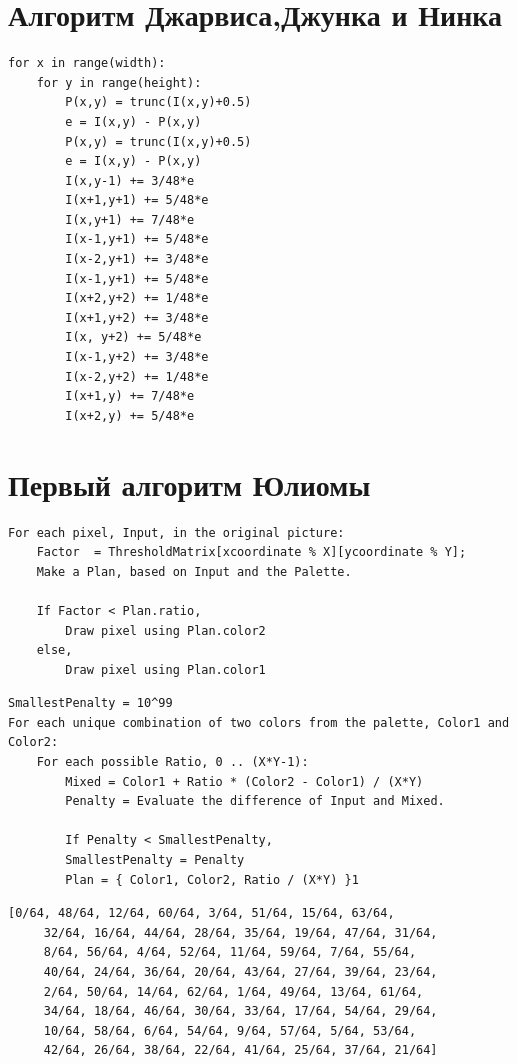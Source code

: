 \section{Алгоритм Джарвиса,Джунка и Нинка}

\begin{lstlisting}[style=pseudocode,caption={Алгоритм Джарвиса,Джунка и Нинка}]
for x in range(width):
    for y in range(height):
        P(x,y) = trunc(I(x,y)+0.5)
        e = I(x,y) - P(x,y)
        P(x,y) = trunc(I(x,y)+0.5)
        e = I(x,y) - P(x,y)
        I(x,y-1) += 3/48*e
        I(x+1,y+1) += 5/48*e
        I(x,y+1) += 7/48*e
        I(x-1,y+1) += 5/48*e
        I(x-2,y+1) += 3/48*e
        I(x-1,y+1) += 5/48*e
        I(x+2,y+2) += 1/48*e
        I(x+1,y+2) += 3/48*e
        I(x, y+2) += 5/48*e
        I(x-1,y+2) += 3/48*e
        I(x-2,y+2) += 1/48*e
        I(x+1,y) += 7/48*e
        I(x+2,y) += 5/48*e

\end{lstlisting}


\bigskip

\section{Первый алгоритм Юлиомы}
\begin{lstlisting}[style=pseudocode,caption={Первый алгоритм Юлиомы}]
For each pixel, Input, in the original picture:
    Factor  = ThresholdMatrix[xcoordinate % X][ycoordinate % Y];
    Make a Plan, based on Input and the Palette.

    If Factor < Plan.ratio,
        Draw pixel using Plan.color2
    else,
        Draw pixel using Plan.color1
\end{lstlisting}

\begin{lstlisting}[style=pseudocode,caption={План нахождения цвета пикселя}]
SmallestPenalty = 10^99 
For each unique combination of two colors from the palette, Color1 and Color2:
    For each possible Ratio, 0 .. (X*Y-1):
        Mixed = Color1 + Ratio * (Color2 - Color1) / (X*Y)
        Penalty = Evaluate the difference of Input and Mixed.

        If Penalty < SmallestPenalty,
        SmallestPenalty = Penalty
        Plan = { Color1, Color2, Ratio / (X*Y) }1
\end{lstlisting}
\begin{lstlisting}[style=pseudocode,caption={Вспомогательная матрица перого Алгоритма Юлиомы}]
     [0/64, 48/64, 12/64, 60/64, 3/64, 51/64, 15/64, 63/64,
     32/64, 16/64, 44/64, 28/64, 35/64, 19/64, 47/64, 31/64,
     8/64, 56/64, 4/64, 52/64, 11/64, 59/64, 7/64, 55/64,
     40/64, 24/64, 36/64, 20/64, 43/64, 27/64, 39/64, 23/64,
     2/64, 50/64, 14/64, 62/64, 1/64, 49/64, 13/64, 61/64,
     34/64, 18/64, 46/64, 30/64, 33/64, 17/64, 54/64, 29/64,
     10/64, 58/64, 6/64, 54/64, 9/64, 57/64, 5/64, 53/64,
     42/64, 26/64, 38/64, 22/64, 41/64, 25/64, 37/64, 21/64]
\end{lstlisting}



